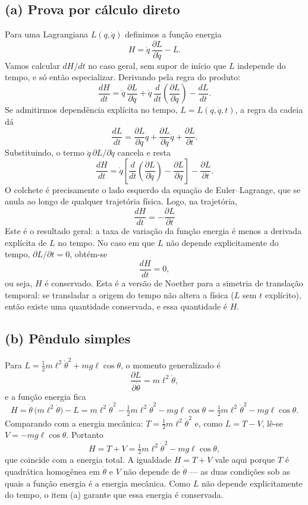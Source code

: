 \documentclass{article}
\begin{document}
\subsection*{(a) Prova por cálculo direto}

Para uma Lagrangiana $L(q,\dot q)$ definimos a função energia
\[
H = \dot q\,\frac{\partial L}{\partial \dot q} - L.
\]
Vamos calcular $dH/dt$ no caso geral, sem supor de início que $L$ independe do
tempo, e só então especializar. Derivando pela regra do produto:
\[
\frac{dH}{dt}
= \ddot q\,\frac{\partial L}{\partial \dot q}
+ \dot q\,\frac{d}{dt}\!\left(\frac{\partial L}{\partial \dot q}\right)
- \frac{dL}{dt}.
\]
Se admitirmos dependência explícita no tempo, $L = L(q,\dot q,t)$, a regra da cadeia dá
\[
\frac{dL}{dt}
= \frac{\partial L}{\partial q}\dot q
+ \frac{\partial L}{\partial \dot q}\ddot q
+ \frac{\partial L}{\partial t}.
\]
Substituindo, o termo $\ddot q\,\partial L/\partial\dot q$ cancela e resta
\[
\frac{dH}{dt}
= \dot q\left[\frac{d}{dt}\!\left(\frac{\partial L}{\partial \dot q}\right)
- \frac{\partial L}{\partial q}\right]
- \frac{\partial L}{\partial t}.
\]
O colchete é precisamente o lado esquerdo da equação de Euler--Lagrange, que se
anula ao longo de qualquer trajetória física. Logo, na trajetória,
\[
\boxed{\;\frac{dH}{dt} = -\frac{\partial L}{\partial t}\;}
\]
Este é o resultado geral: a taxa de variação da função energia é menos a derivada
explícita de $L$ no tempo. No caso em que $L$ não depende explicitamente do tempo,
$\partial L/\partial t = 0$, obtém-se
\[
\frac{dH}{dt} = 0,
\]
ou seja, $H$ é conservado. Esta é a versão de Noether para a simetria de translação
temporal: se transladar a origem do tempo não altera a física ($L$ sem $t$
explícito), então existe uma quantidade conservada, e essa quantidade é $H$.

\subsection*{(b) Pêndulo simples}

Para $L = \tfrac{1}{2}m\ell^2\dot\theta^2 + mg\ell\cos\theta$, o momento generalizado é
\[
\frac{\partial L}{\partial \dot\theta} = m\ell^2\dot\theta,
\]
e a função energia fica
\[
H = \dot\theta\,\bigl(m\ell^2\dot\theta\bigr) - L
= m\ell^2\dot\theta^2 - \tfrac{1}{2}m\ell^2\dot\theta^2 - mg\ell\cos\theta
= \tfrac{1}{2}m\ell^2\dot\theta^2 - mg\ell\cos\theta.
\]
Comparando com a energia mecânica: $T = \tfrac{1}{2}m\ell^2\dot\theta^2$ e, como
$L = T - V$, lê-se $V = -mg\ell\cos\theta$. Portanto
\[
H = T + V = \tfrac{1}{2}m\ell^2\dot\theta^2 - mg\ell\cos\theta,
\]
que coincide com a energia total. A igualdade $H = T + V$ vale aqui porque $T$ é
quadrática homogênea em $\dot\theta$ e $V$ não depende de $\dot\theta$ — as duas
condições sob as quais a função energia é a energia mecânica. Como $L$ não depende
explicitamente do tempo, o item (a) garante que essa energia é conservada.
\end{document}
